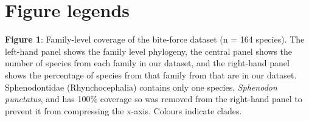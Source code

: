 \documentclass[a4paper, 12pt]{article}
\begin{document}




\newpage

\begin{landscape}
  
\end{landscape}


\section{Figure legends}


\textbf{Figure 1}: 
  Family-level coverage of the bite-force dataset (n = 164 species). 
  The left-hand panel shows the family level phylogeny, the central panel shows the number of species from each family in our dataset, and the right-hand panel shows the percentage of species from that family from\cite{uetz2020reptile} that are in our dataset. 
  Sphenodontidae (Rhynchocephalia) contains only one species, \textit{Sphenodon punctatus}, and has 100\% coverage so was removed from the right-hand panel to prevent it from compressing the x-axis. 
  Colours indicate clades.
\end{document}
